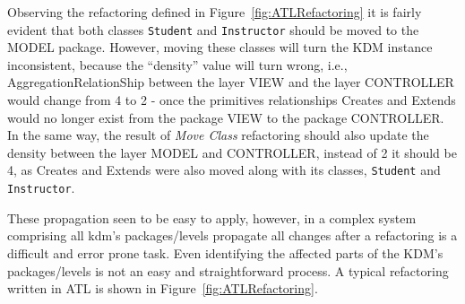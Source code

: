 Observing the refactoring defined in Figure~\ref{fig:ATLRefactoring} it is fairly evident that both classes \texttt{Student} and \texttt{Instructor} should be moved to the MODEL package.
%
However, moving these classes will turn the KDM instance inconsistent, because the ``density'' value will turn wrong, i.e., AggregationRelationShip between
the layer VIEW and the layer CONTROLLER would
change from 4 to 2 - once the primitives relationships Creates
and Extends would no longer exist from the package VIEW
to the package CONTROLLER. In the same way, the result of \textit{Move Class} refactoring should also update the density between the layer
MODEL and CONTROLLER, instead of 2 it should be 4, as
Creates and Extends were also moved along with its
classes, \texttt{Student} and \texttt{Instructor}.

These propagation seen to be easy to apply, however, in a complex system comprising all kdm's packages/levels propagate all changes after a refactoring is a difficult and error prone task. Even identifying the affected parts of the KDM's packages/levels is not an easy and straightforward process. A typical refactoring written in ATL is shown in Figure~\ref{fig:ATLRefactoring}.









